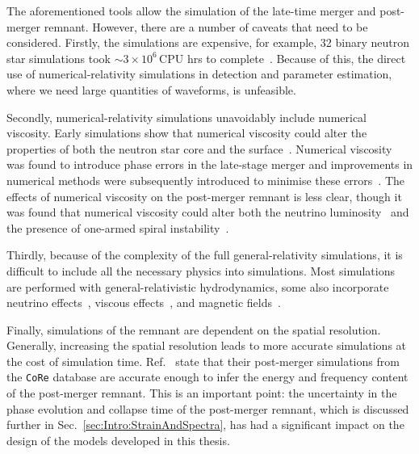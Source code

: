 \documentclass[../Thesis.tex]{subfiles}
\begin{document}
    The aforementioned tools allow the simulation of the late-time merger and post-merger remnant.
    However, there are a number of caveats that need to be considered.
    Firstly, the simulations are expensive, for example, 32 binary neutron star simulations took  $\sim 3\times 10^6\,$CPU hrs to complete~\cite{Takami2015}.
    Because of this, the direct use of numerical-relativity simulations in detection and parameter estimation, where we need large quantities of waveforms, is unfeasible. \par
    Secondly, numerical-relativity simulations unavoidably include numerical viscosity.
    Early simulations show that numerical viscosity could alter the properties of both the neutron star core and the surface~\cite{Shibata2000bar,Cerda-Duran2010}.
    Numerical viscosity was found to introduce phase errors in the late-stage merger and improvements in numerical methods were subsequently introduced to minimise these errors~\cite{Radice2014}.
    The effects of numerical viscosity on the post-merger remnant is less clear, though it was found that numerical viscosity could alter both the neutrino luminosity~\cite{Sekiguchi2016} and the presence of one-armed spiral instability~\cite{Radice2016}.\par

    Thirdly, because of the complexity of the full general-relativity simulations, it is difficult to include all the necessary physics into simulations.
    Most simulations are performed with general-relativistic hydrodynamics, some also incorporate neutrino effects~\cite[e.g.,][]{Sekiguchi2011,Perego2014,Foucart2016,Radice2016a,Zappa2018}, viscous effects~\cite[e.g.,][]{Shapiro2000,Duez2004, Radice2017,Shibata2017}, and magnetic fields~\cite[e.g.,][]{Duez2006,Duez2006a,Siegel2013,Siegel2014,Giacomazzo2011,Kiuchia2012,Giacomazzo2013,Kiuchi2014,Giacomazzo2015}. \par

    Finally, simulations of the remnant are dependent on the spatial resolution.
    Generally, increasing the spatial resolution leads to more accurate simulations at the cost of simulation time.
    Ref.~\cite{Dietrich2018} state that their post-merger simulations from  the \texttt{CoRe} database are accurate enough to infer the energy and frequency content of the post-merger remnant.
    This is an important point: the uncertainty in the phase evolution  and collapse time of the post-merger remnant, which is discussed further in Sec.~\ref{sec:Intro:StrainAndSpectra}, has had a significant impact on the design of the models developed in this thesis.
\end{document}
